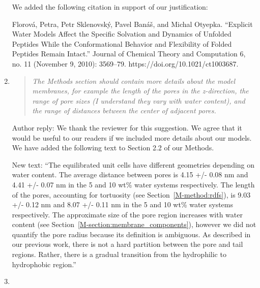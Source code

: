 \documentclass{article}
\begin{document}
\begin{enumerate}
  	We added the following citation in support of our justification:
    
    Florová, Petra, Petr Sklenovský, Pavel Banáš, and Michal Otyepka. “Explicit Water 
    Models Affect the Specific Solvation and Dynamics of Unfolded Peptides While the 
    Conformational Behavior and Flexibility of Folded Peptides Remain Intact.” Journal 
    of Chemical Theory and Computation 6, no. 11 (November 9, 2010): 3569–79. https://doi.org/10.1021/ct1003687.

    \item \begin{quote}
    
    \textit{The Methods section should contain more details about the model membranes, for 
    example the length of the pores in the z-direction, the range of pore sizes (I understand
    they vary with water content), and the range of distances between the center of adjacent pores.}    
    
    \end{quote}
    
    Author reply: We thank the reviewer for this suggestion. We agree that it would be useful
    to our readers if we included more details about our models. We have added the following 
    text to Section 2.2 of our Methods.
    
    New text: ``The equilibrated unit cells have different geometries depending on water
    content. The average distance between pores is 4.15 +/- 0.08 nm and 4.41 +/- 0.07 nm
    in the 5 and 10 wt\% water systems respectively. The length of the pores, accounting
    for tortuosity (see Section~\ref{M-method:rdfs}), is 9.03 +/- 0.12 nm and 8.07 +/- 0.11
    nm in the 5 and 10 wt\% water systems respectively. The approximate size of the pore
    region increases with water content (see Section~\ref{M-section:membrane_components}), 
    however we did not quantify the pore radius because its definition is ambiguous. As
    described in our previous work, there is not a hard partition between the pore and tail
    regions. Rather, there is a gradual transition from the hydrophilic to hydrophobic region.''  
    
    \item \begin{quote}
    

\end{quote}
\end{enumerate}
\end{document}
